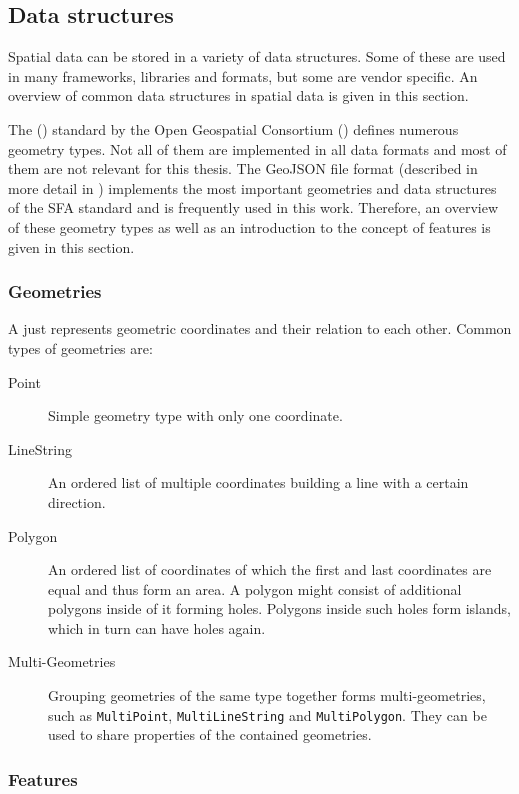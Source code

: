 	\subsection{Data structures}
	\label{subsec:data-structures}
	
		Spatial data can be stored in a variety of data structures.
		Some of these are used in many frameworks, libraries and formats, but some are vendor specific.
		An overview of common data structures in spatial data is given in this section.
		
		The  () standard by the Open Geospatial Consortium () defines numerous geometry types\cite{ogc-sfa}.
		Not all of them are implemented in all data formats and most of them are not relevant for this thesis.
		The GeoJSON file format (described in more detail in ) implements the most important geometries and data structures of the SFA standard and is frequently used in this work.
		Therefore, an overview of these geometry types as well as an introduction to the concept of features is given in this section.
		
		\subsubsection{Geometries}
		
			A  just represents geometric coordinates and their relation to each other.
			Common types of geometries are:
			\begin{description}
				\item[Point] Simple geometry type with only one coordinate.
				\item[LineString] An ordered list of multiple coordinates building a line with a certain direction.
				\item[Polygon] An ordered list of coordinates of which the first and last coordinates are equal and thus form an area. A polygon might consist of additional polygons inside of it forming holes. Polygons inside such holes form islands, which in turn can have holes again.
				\item[Multi-Geometries] Grouping geometries of the same type together forms multi-geometries, such as \texttt{MultiPoint}, \texttt{MultiLineString} and \texttt{MultiPolygon}. They can be used to share properties of the contained geometries.
			\end{description}
		
		\subsubsection{Features}
		

